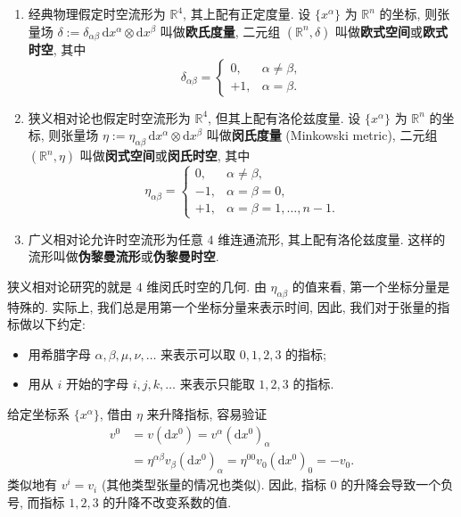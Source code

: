 \begin{enumerate}
    \item 经典物理假定时空流形为 $ \mathbb{R}^4 $, 其上配有正定度量. 设 $ \{x^\alpha\} $ 为 $ \mathbb{R}^n $ 的坐标, 则张量场 $ \delta:=\delta_{\alpha\beta}\,\mathrm{d}x^\alpha\otimes\mathrm{d}x^\beta $ 叫做{\bf 欧氏度量}, 二元组 $ (\mathbb{R}^n,\delta) $ 叫做{\bf 欧式空间}或{\bf 欧式时空}, 其中
    \[ \delta_{\alpha\beta}=\begin{cases}
        0, & \alpha\neq\beta,\\ +1, & \alpha=\beta.
    \end{cases} \]
    \item 狭义相对论也假定时空流形为 $ \mathbb{R}^4 $, 但其上配有洛伦兹度量. 设 $ \{x^\alpha\} $ 为 $ \mathbb{R}^n $ 的坐标, 则张量场 $ \eta:=\eta_{\alpha\beta}\,\mathrm{d}x^\alpha\otimes\mathrm{d}x^\beta $ 叫做{\bf 闵氏度量} (Minkowski metric), 二元组 $ (\mathbb{R}^n,\eta) $ 叫做{\bf 闵式空间}或{\bf 闵氏时空}, 其中
    \[ \eta_{\alpha\beta}=\begin{cases}
        0, & \alpha\neq\beta,\\ -1, & \alpha=\beta=0,\\ +1, & \alpha=\beta=1,\dots,n-1.
    \end{cases} \]
    \item 广义相对论允许时空流形为任意 $ 4 $ 维连通流形, 其上配有洛伦兹度量. 这样的流形叫做{\bf 伪黎曼流形}或{\bf 伪黎曼时空}.
\end{enumerate}

狭义相对论研究的就是 $ 4 $ 维闵氏时空的几何. 由 $\eta_{\alpha\beta}$ 的值来看, 第一个坐标分量是特殊的. 实际上, 我们总是用第一个坐标分量来表示时间, 因此, 我们对于张量的指标做以下约定:
\begin{itemize}
    \item 用希腊字母 $\alpha,\beta,\mu,\nu,\dots$ 来表示可以取 $0,1,2,3$ 的指标;
    \item 用从 $ i $ 开始的字母 $ i,j,k,\dots $ 来表示只能取 $1,2,3$ 的指标.
\end{itemize}

给定坐标系 $\{x^\alpha\}$, 借由 $\eta$ 来升降指标, 容易验证
\begin{align*}
    v^0 &=v(\mathrm{d}x^0)=v^\alpha(\mathrm{d}x^0)_{\alpha}\\
    &=\eta^{\alpha\beta}v_{\beta}(\mathrm{d}x^0)_{\alpha}=\eta^{00}v_{0}(\mathrm{d}x^0)_{0}=-v_0.
\end{align*}
类似地有 $v^i=v_i$ (其他类型张量的情况也类似). 因此, 指标 $0$ 的升降会导致一个负号, 而指标 $1,2,3$ 的升降不改变系数的值.

